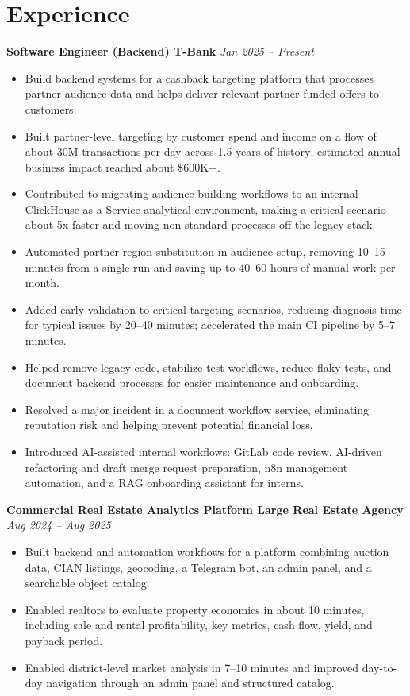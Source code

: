 \documentclass[10pt,a4paper]{article}
\begin{document}
\section*{Experience}

\textbf{Software Engineer (Backend) \textbar{} T-Bank} \hfill \textit{Jan 2025 -- Present}
\begin{itemize}
  \item Build backend systems for a cashback targeting platform that processes partner audience data and helps deliver relevant partner-funded offers to customers.
  \item Built partner-level targeting by customer spend and income on a flow of about 30M transactions per day across 1.5 years of history; estimated annual business impact reached about \$600K+.
  \item Contributed to migrating audience-building workflows to an internal ClickHouse-as-a-Service analytical environment, making a critical scenario about 5x faster and moving non-standard processes off the legacy stack.
  \item Automated partner-region substitution in audience setup, removing 10--15 minutes from a single run and saving up to 40--60 hours of manual work per month.
  \item Added early validation to critical targeting scenarios, reducing diagnosis time for typical issues by 20--40 minutes; accelerated the main CI pipeline by 5--7 minutes.
  \item Helped remove legacy code, stabilize test workflows, reduce flaky tests, and document backend processes for easier maintenance and onboarding.
  \item Resolved a major incident in a document workflow service, eliminating reputation risk and helping prevent potential financial loss.
  \item Introduced AI-assisted internal workflows: GitLab code review, AI-driven refactoring and draft merge request preparation, n8n management automation, and a RAG onboarding assistant for interns.
\end{itemize}

\textbf{Commercial Real Estate Analytics Platform \textbar{} Large Real Estate Agency} \hfill \textit{Aug 2024 -- Aug 2025}
\begin{itemize}
  \item Built backend and automation workflows for a platform combining auction data, CIAN listings, geocoding, a Telegram bot, an admin panel, and a searchable object catalog.
  \item Enabled realtors to evaluate property economics in about 10 minutes, including sale and rental profitability, key metrics, cash flow, yield, and payback period.
  \item Enabled district-level market analysis in 7--10 minutes and improved day-to-day navigation through an admin panel and structured catalog.
\end{itemize}
\end{document}
